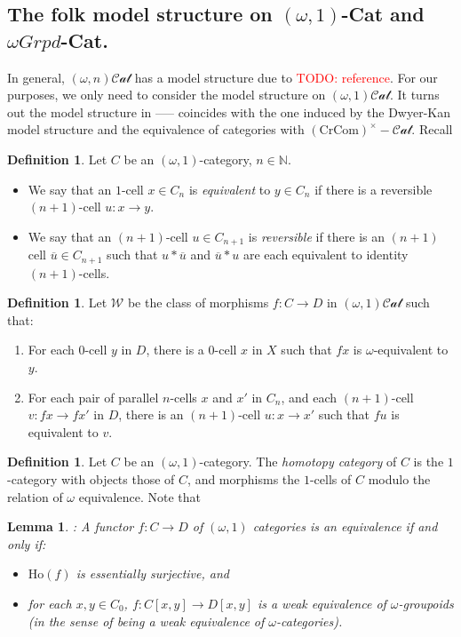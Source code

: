 \documentclass[12pt]{article}
\newtheorem{lemma}[theorem]{Lemma}
\theoremstyle{definition}
\newtheorem{definition}[theorem]{Definition}
\newcommand{\TODO}[1]{\textcolor{red}{TODO: {#1}}}
\newcommand{\crcom}{\text{CrCom}}
\newcommand{\omegancat}[1]{(\omega,#1)\mathcal{Cat}}
\newcommand{\cartcrossedcat}{(\crcom)^\times-\mathcal{Cat}}
\newcommand{\Ho}{\text{Ho}}
\begin{document}
	\subsection{The folk model structure on $(\omega,1)$-Cat and $\omega Grpd$-Cat.}
		In general, $\omegancat{n}$ has a model structure due to \TODO{reference}. For our purposes, we only need to consider the model structure on $\omegancat{1}$. It turns out the model structure in  ----- coincides with the one induced by the Dwyer-Kan model structure and the equivalence of categories with $\cartcrossedcat$. Recall
		\begin{definition}
		Let $C$ be an $(\omega,1)$-category, $n \in \mathbb{N}$.
			\begin{itemize}
				\item We say that an $1$-cell $x \in C_n$ is \emph{equivalent} to $y \in C_n$ if there is a reversible $(n+1)$-cell $u: x \to y$.
				\item We say that an $(n+1)$-cell $u \in C_{n+1}$ is \emph{reversible} if there is an $(n+1)$ cell $\overline{u} \in C_{n+1}$ such that $u * \overline{u}$ and $\overline{u} * u$ are each equivalent to identity $(n+1)$-cells.
			\end{itemize}
		\end{definition}
		\begin{definition}
			Let $\mathcal{W}$ be the class of morphisms $f: C \to D$ in $\omegancat{1}$ such that:
			\begin{enumerate}
				\item For each $0$-cell $y$ in $D$, there is a $0$-cell $x$ in $X$ such that $fx$ is $\omega$-equivalent to $y$.
				\item For each pair of parallel $n$-cells $x$ and $x'$ in $C_n$, and each $(n+1)$-cell $v:fx \to fx'$ in $D$, there is an $(n+1)$-cell $u:x \to x'$ such that $f u$ is equivalent to $v$.
			\end{enumerate}
		\end{definition}
		\begin{definition}
			Let $C$ be an $(\omega,1)$-category. The \textit{homotopy category} of $C$ is the $1$-category with objects those of $C$, and morphisms the $1$-cells of $C$ modulo the relation of $\omega$ equivalence. Note that 
		\end{definition}
		\begin{lemma}: 
			A functor $f: C \to D$ of $(\omega,1)$ categories is an equivalence if and only if:
			\begin{itemize}
				\item $\Ho(f)$ is essentially surjective, and
				\item for each $x,y \in C_0$, $f: C[x,y] \to D[x,y]$ is a weak equivalence of $\omega$-groupoids (in the sense of being a weak equivalence of $\omega$-categories).
			\end{itemize}
		\end{lemma}
\end{document}
